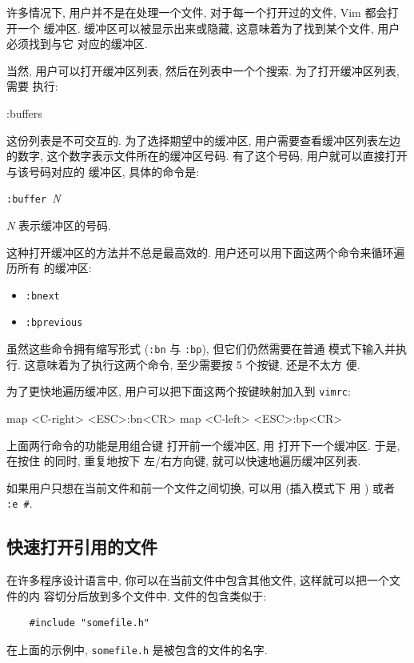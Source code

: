 许多情况下, 用户并不是在处理一个文件, 对于每一个打开过的文件, Vim 都会打开一个
缓冲区. 缓冲区可以被显示出来或隐藏, 这意味着为了找到某个文件, 用户必须找到与它
对应的缓冲区.

当然, 用户可以打开缓冲区列表, 然后在列表中一个个搜索. 为了打开缓冲区列表, 需要
执行:
\begin{vimcode}
:buffers
\end{vimcode}

这份列表是不可交互的. 为了选择期望中的缓冲区, 用户需要查看缓冲区列表左边的数字,
这个数字表示文件所在的缓冲区号码. 有了这个号码, 用户就可以直接打开与该号码对应的
缓冲区, 具体的命令是:
\begin{vimcmdform}
\texttt{:buffer }\textit{N}
\end{vimcmdform}
\textit{N} 表示缓冲区的号码.

这种打开缓冲区的方法并不总是最高效的. 用户还可以用下面这两个命令来循环遍历所有
的缓冲区:
\begin{itemize}
    \item \texttt{:bnext}
    \item \texttt{:bprevious}
\end{itemize}

虽然这些命令拥有缩写形式 (\texttt{:bn} 与 \texttt{:bp}), 但它们仍然需要在普通
模式下输入并执行. 这意味着为了执行这两个命令, 至少需要按 5 个按键, 还是不太方
便.

为了更快地遍历缓冲区, 用户可以把下面这两个按键映射加入到 \texttt{vimrc}:
\begin{vimcode}
map <C-right> <ESC>:bn<CR>
map <C-left> <ESC>:bp<CR>
\end{vimcode}
上面两行命令的功能是用组合键  打开前一个缓冲区, 用
 打开下一个缓冲区. 于是, 在按住  的同时, 重复地按下
左/右方向键, 就可以快速地遍历缓冲区列表.

\begin{warning}
    如果用户只想在当前文件和前一个文件之间切换, 可以用  (插入模式下
    用  ) 或者 \texttt{:e \#}.
\end{warning}

\subsection{快速打开引用的文件}
\label{subsec:open_referenced_files_faster}

在许多程序设计语言中, 你可以在当前文件中包含其他文件, 这样就可以把一个文件的内
容切分后放到多个文件中. 文件的包含类似于:
\begin{verbatim}
    #include "somefile.h"
\end{verbatim}
在上面的示例中, \texttt{somefile.h} 是被包含的文件的名字.

